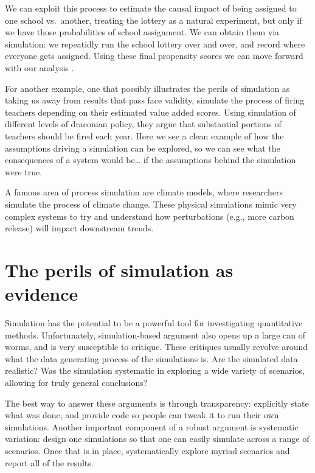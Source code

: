 \documentclass[
]{book}
\begin{document}
We can exploit this process to estimate the causal impact of being assigned to one school vs.~another, treating the lottery as a natural experiment, but only if we have those probabilities of school assignment.
We can obtain them via simulation: we repeatidly run the school lottery over and over, and record where everyone gets assigned.
Using these final propensity scores we can move forward with our analysis \citep{abdulkadirouglu2017research}.

For another example, one that possibly illustrates the perils of simulation as taking us away from results that pass face validity, \citet{staiger2010searching} simulate the process of firing teachers depending on their estimated value added scores.
Using simulation of different levels of draconian policy, they argue that substantial portions of teachers should be fired each year.
Here we see a clean example of how the assumptions driving a simulation can be explored, so we can see what the consequences of a system would be\ldots{} if the assumptions behind the simulation were true.

A famous area of process simulation are climate models, where researchers simulate the process of climate change.
These physical simulations mimic very complex systems to try and understand how perturbations (e.g., more carbon release) will impact downstream trends.

\hypertarget{the-perils-of-simulation-as-evidence}{%
\section{The perils of simulation as evidence}\label{the-perils-of-simulation-as-evidence}}

Simulation has the potential to be a powerful tool for investigating quantitative methods.
Unfortunately, simulation-based argument also opens up a large can of worms, and is very susceptible to critique.
These critiques usually revolve around what the data generating process of the simulations is.
Are the simulated data realistic?
Was the simulation systematic in exploring a wide variety of scenarios, allowing for truly general conclusions?

The best way to answer these arguments is through transparency: explicitly state what was done, and provide code so people can tweak it to run their own simulations.
Another important component of a robust argument is systematic variation: design one simulations so that one can easily simulate across a range of scenarios.
Once that is in place, systematically explore myriad scenarios and report all of the results.
\end{document}
